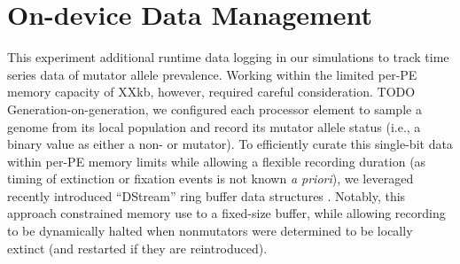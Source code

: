

\section{On-device Data Management}
\label{sec:dynamics}



This experiment additional runtime data logging in our simulations to track time series data of mutator allele prevalence.
Working within the limited per-PE memory capacity of XXkb, however, required careful consideration. TODO
Generation-on-generation, we configured each processor element to sample a genome from its local population and record its mutator allele status (i.e., a binary value as either a non- or mutator).
To efficiently curate this single-bit data within per-PE memory limits while allowing a flexible recording duration (as timing of extinction or fixation events is not known \textit{a priori}), we leveraged recently introduced ``DStream'' ring buffer data structures \citep{moreno2024algorithms}.
Notably, this approach constrained memory use to a fixed-size buffer, while allowing recording to be dynamically halted when nonmutators were determined to be locally extinct (and restarted if they are reintroduced).

